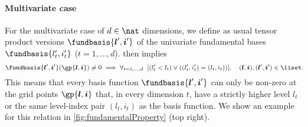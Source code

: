 %

\paragraph{Multivariate case}

For the multivariate case of $d \in \nat$ dimensions,
we define as usual tensor product versions
$\fundbasis{\*l',\*i'}$ of the univariate fundamental bases
$\fundbasis{l'_t,i'_t}$ ($t = 1, \dotsc, d$).
 then implies
\begin{equation}
  \label{eq:fundamentalPropertyImplicationMV}
  \fundbasis{\*l',\*i'}(\gp{\*l,\*i}) \not= 0
  \implies
  \falarge{t = 1, \dotsc, d}{
    \bracket*{(l'_t < l_t) \lor ((l'_t, i'_t) = (l_t, i_t))}
  },\quad
  (\*l, \*i), (\*l',\*i') \in \liset.
  \hspace*{-1mm}
\end{equation}
This means that every basis function
$\fundbasis{\*l',\*i'}$ can only be non-zero
at the grid points $\gp{\*l,\*i}$ that, in every dimension $t$,
have a strictly higher level $l_t$ or
the same level-index pair $(l_t, i_t)$ as the basis function.
We show an example for this relation in
\cref{fig:fundamentalProperty} (top right).

